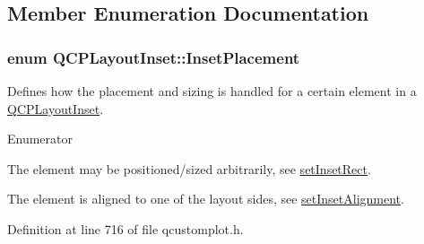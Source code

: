 \subsection{Member Enumeration Documentation}
\hypertarget{class_q_c_p_layout_inset_a8b9e17d9a2768293d2a7d72f5e298192}{
\subsubsection[{Inset\-Placement}]{\setlength{\rightskip}{0pt plus 5cm}enum {\bf Q\-C\-P\-Layout\-Inset\-::\-Inset\-Placement}}}\label{class_q_c_p_layout_inset_a8b9e17d9a2768293d2a7d72f5e298192}
Defines how the placement and sizing is handled for a certain element in a \hyperlink{class_q_c_p_layout_inset}{Q\-C\-P\-Layout\-Inset}. \begin{Desc}
\item[Enumerator]\par
\begin{description}
\item[{\em 
\hypertarget{class_q_c_p_layout_inset_a8b9e17d9a2768293d2a7d72f5e298192aa4802986ea2cea457f932b115acba59e}{ip\-Free}\label{class_q_c_p_layout_inset_a8b9e17d9a2768293d2a7d72f5e298192aa4802986ea2cea457f932b115acba59e}
}]The element may be positioned/sized arbitrarily, see \hyperlink{class_q_c_p_layout_inset_aa487c8378a6f9533567a2e6430099dc3}{set\-Inset\-Rect}. \item[{\em 
\hypertarget{class_q_c_p_layout_inset_a8b9e17d9a2768293d2a7d72f5e298192aa81e7df4a785ddee2229a8f47c46e817}{ip\-Border\-Aligned}\label{class_q_c_p_layout_inset_a8b9e17d9a2768293d2a7d72f5e298192aa81e7df4a785ddee2229a8f47c46e817}
}]The element is aligned to one of the layout sides, see \hyperlink{class_q_c_p_layout_inset_a62882a4f9ad58bb0f53da12fde022abe}{set\-Inset\-Alignment}. \end{description}
\end{Desc}


Definition at line 716 of file qcustomplot.\-h.



